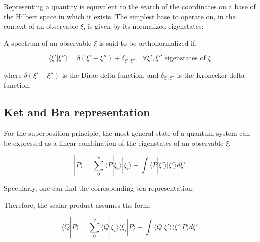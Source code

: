 \documentclass{article}
\begin{document}
Representing a quantity is equivalent to the search of the coordinates on a base of the Hilbert space in which it exists.
The simplest base to operate on, in the context of an observable $\xi$, is given by its normalized eigenstates:

\begin{tcolorbox}[colframe=gray!90, colback=blue!5, coltitle=white, title=\textbf{Definition: Orthonormalized Eigenstates}, fonttitle=\large\bfseries]

  A spectrum of an observable $\xi$ is said to be orthonormalized if:

  \begin{equation}
    \langle \xi'|\xi''\rangle  = \delta(\xi'-\xi'') + \delta_{\xi',\xi''} \quad \forall \xi',\xi'' \text{ eigenstates of $\xi$}
  \end{equation}

  where $\delta(\xi'-\xi'')$ is the Dirac delta function, and $\delta_{\xi',\xi''}$ is the Kronecker delta function.

\end{tcolorbox}

\subsection{Ket and Bra representation}

For the superposition principle, the most general state of a quantum system can be expressed as a linear combination of the eigenstates of an observable $\xi$.

\begin{tcolorbox}[colframe=gray!50, colback=gray!10, coltitle=black, title=Ket representation]
  \begin{equation}
    |P\rangle = \sum_{0}^{v} \langle P|\xi_i\rangle |\xi_i\rangle + \int \langle P|\xi'\rangle |\xi'\rangle d\xi'
  \end{equation}
\end{tcolorbox}

Specularly, one can find the corresponding bra representation.

Therefore, the scalar product assumes the form:

\begin{tcolorbox}[colframe=gray!50, colback=gray!10, coltitle=black, title=Scalar product]
  \begin{equation}
    \langle Q|P\rangle = \sum_{0}^{v} \langle Q|\xi_i\rangle \langle \xi_i|P\rangle + \int \langle Q|\xi'\rangle \langle \xi'|P\rangle d\xi'
  \end{equation}
\end{tcolorbox}
\end{document}
